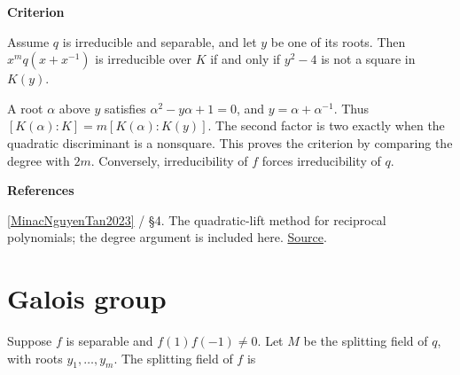 \documentclass[11pt,a4paper,oneside,openany]{book}
\newenvironment{sources}{\par\smallskip\begingroup\footnotesize\color{atlasgray}\leftskip=10pt\setlength{\parskip}{2pt}}{\par\endgroup\smallskip}
\begin{document}
\begin{atlasblock}[standard]
\textbf{\sffamily Criterion}\par\smallskip
\color{black} Assume \(q\) is irreducible and separable, and let \(y\) be one of its roots. Then \(x^m q(x+x^{-1})\) is irreducible over \(K\) if and only if \(y^2-4\) is not a square in \(K(y)\).\par
\end{atlasblock}\color{black}

\begin{atlasblock}[standard]
\color{black} A root \(\alpha\) above \(y\) satisfies \(\alpha^2-y\alpha+1=0\), and \(y=\alpha+\alpha^{-1}\). Thus \([K(\alpha):K]=m[K(\alpha):K(y)]\). The second factor is two exactly when the quadratic discriminant is a nonsquare. This proves the criterion by comparing the degree with \(2m\). Conversely, irreducibility of \(f\) forces irreducibility of \(q\).\par
\end{atlasblock}\color{black}
\begin{sources}
\textbf{References}\par\smallskip
\noindent\hyperlink{ref:MinacNguyenTan2023}{[MinacNguyenTan2023]} / §4. The quadratic-lift method for reciprocal polynomials; the degree argument is included here. \href{https://arxiv.org/abs/2111.05256}{Source}.\par
\end{sources}\color{black}
\section{Galois group}
\color{black} Suppose \(f\) is separable and \(f(1)f(-1)\ne0\). Let \(M\) be the splitting field of \(q\), with roots \(y_1,\ldots,y_m\). The splitting field of \(f\) is\par
\end{document}

